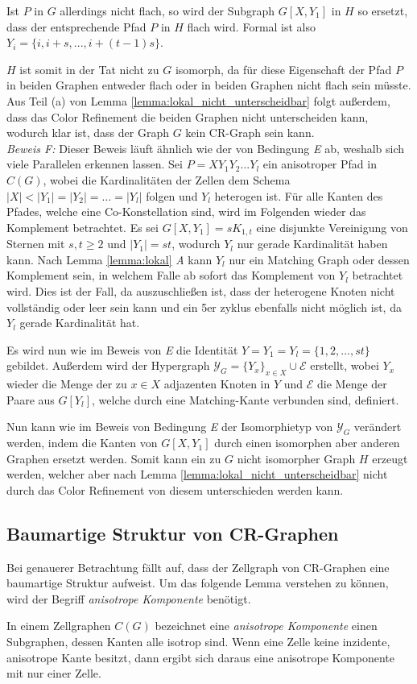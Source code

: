 Ist $P$ in $G$ allerdings nicht flach, so wird der Subgraph $G[X,Y_1]$ in $H$ so ersetzt, dass der entsprechende Pfad $P$ in $H$ flach wird.
Formal ist also $Y_i=\{i,i+s,...,i+(t-1)s\}$.

$H$ ist somit in der Tat nicht zu $G$ isomorph, da für diese Eigenschaft der Pfad $P$ in beiden Graphen entweder flach oder in beiden Graphen nicht flach sein müsste.
Aus Teil (a) von Lemma \ref{lemma:lokal_nicht_unterscheidbar} folgt außerdem, dass das Color Refinement die beiden Graphen nicht unterscheiden kann, wodurch klar ist, dass der Graph $G$ kein CR-Graph sein kann.\\

\emph{Beweis F:} Dieser Beweis läuft ähnlich wie der von Bedingung \emph{E} ab, weshalb sich viele Parallelen erkennen lassen.
Sei $P=XY_1Y_2...Y_l$ ein anisotroper Pfad in $C(G)$, wobei die Kardinalitäten der Zellen dem Schema $|X|<|Y_1|=|Y_2|=...=|Y_l|$ folgen und $Y_l$ heterogen ist.
Für alle Kanten des Pfades, welche eine Co-Konstellation sind, wird im Folgenden wieder das Komplement betrachtet.
Es sei $G[X,Y_1]=sK_{1,t}$ eine disjunkte Vereinigung von Sternen mit $s,t\geq 2$ und $|Y_1|=st$, wodurch $Y_l$ nur gerade Kardinalität haben kann.
Nach Lemma \ref{lemma:lokal} \emph{A} kann $Y_l$ nur ein Matching Graph oder dessen Komplement sein, in welchem Falle ab sofort das Komplement von $Y_l$ betrachtet wird.
Dies ist der Fall, da auszuschließen ist, dass der heterogene Knoten nicht vollständig oder leer sein kann und ein 5er \gls{zyklus} ebenfalls nicht möglich ist, da $Y_l$ gerade Kardinalität hat.

Es wird nun wie im Beweis von \emph{E} die Identität $Y=Y_1=Y_l=\{1,2,...,st\}$ gebildet.
Außerdem wird der Hypergraph $\mathcal{Y}_G=\{Y_x\}_{x\in X}\cup \mathcal{E}$ erstellt, wobei $Y_x$ wieder die Menge der zu $x\in X$ adjazenten Knoten in $Y$ und $\mathcal{E}$ die Menge der Paare aus $G[Y_l]$, welche durch eine Matching-Kante verbunden sind, definiert.

Nun kann wie im Beweis von Bedingung \emph{E} der Isomorphietyp von $\mathcal{Y}_G$ verändert werden, indem die Kanten von $G[X,Y_1]$ durch einen isomorphen aber anderen Graphen ersetzt werden.
Somit kann ein zu $G$ nicht isomorpher Graph $H$ erzeugt werden, welcher aber nach Lemma \ref{lemma:lokal_nicht_unterscheidbar} nicht durch das Color Refinement von diesem unterschieden werden kann.

\subsection{Baumartige Struktur von CR-Graphen}
Bei genauerer Betrachtung fällt auf, dass der Zellgraph von CR-Graphen eine baumartige Struktur aufweist.
Um das folgende Lemma verstehen zu können, wird der Begriff \emph{anisotrope Komponente} benötigt.
\begin{Definition}
	In einem Zellgraphen $C(G)$ bezeichnet eine \emph{anisotrope Komponente} einen Subgraphen, dessen Kanten alle isotrop sind.
	Wenn eine Zelle keine inzidente, anisotrope Kante besitzt, dann ergibt sich daraus eine anisotrope Komponente mit nur einer Zelle.
\end{Definition}


